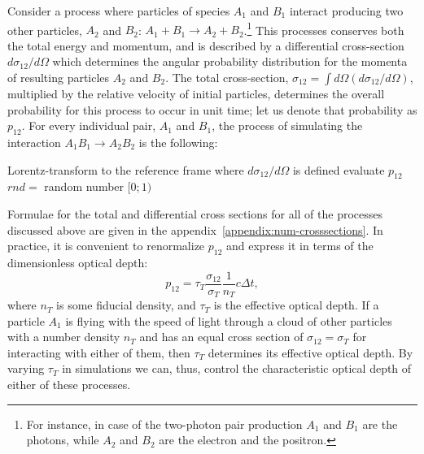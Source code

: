 Consider a process where particles of species $A_1$ and $B_1$ interact producing two other particles, $A_2$ and $B_2$: $A_1+B_1\to A_2+B_2$.\footnote{For instance, in case of the two-photon pair production $A_1$ and $B_1$ are the photons, while $A_2$ and $B_2$ are the electron and the positron.} This processes conserves both the total energy and momentum, and is described by a differential cross-section $d\sigma_{12} / d\Omega$ which determines the angular probability distribution for the momenta of resulting particles $A_2$ and $B_2$. The total cross-section, $\sigma_{12}=\int d\Omega \left(d\sigma_{12} / d\Omega\right)$, multiplied by the relative velocity of initial particles, determines the overall probability for this process to occur in unit time; let us denote that probability as $p_{12}$. For every individual pair, $A_1$ and $B_1$, the process of simulating the interaction $A_1B_1\to A_2B_2$ is the following:

\begin{algorithm}[H]
    Lorentz-transform to the reference frame where $d\sigma_{12} / d\Omega$ is defined\;
    evaluate $p_{12}$\;
    $rnd =$ random number $[0;1)$\;
\end{algorithm}

\noindent Formulae for the total and differential cross sections for all of the processes discussed above are given in the appendix~\ref{appendix:num-crosssections}. In practice, it is convenient to renormalize $p_{12}$ and express it in terms of the dimensionless optical depth:
\begin{equation}
    p_{12} = \tau_{T} \frac{\sigma_{12}}{\sigma_T} \frac{1}{n_T} c \Delta t,
\end{equation}
\noindent where $n_T$ is some fiducial density, and $\tau_T$ is the effective optical depth. If a particle $A_1$ is flying with the speed of light through a cloud of other particles with a number density $n_T$ and has an equal cross section of $\sigma_{12}=\sigma_T$ for interacting with either of them, then $\tau_T$ determines its effective optical depth. By varying $\tau_T$ in simulations we can, thus, control the characteristic optical depth of either of these processes. 

